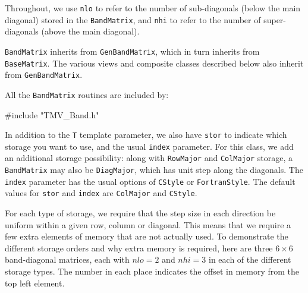 \documentclass[twoside,letterpaper,11pt]{article}
\renewcommand{\tt}[1]{{\lstinline {#1}}}
\begin{document}
Throughout, we use \tt{nlo} to refer to the number of sub-diagonals 
(below the main diagonal) stored
in the \tt{BandMatrix}, and \tt{nhi} to refer to the number of super-diagonals
(above the main diagonal).

\tt{BandMatrix} inherits from \tt{GenBandMatrix}, which in turn inherits from
\tt{BaseMatrix}.  
The various views and composite classes described below 
also inherit from \tt{GenBandMatrix}.

All the \tt{BandMatrix} routines are included by:
\begin{tmvcode}
#include "TMV_Band.h"
\end{tmvcode}

In addition to the \tt{T} template parameter, we also have \tt{stor} to indicate 
which storage you want to use, and the usual \tt{index} parameter.
For this class, we add an additional storage possibility:
along with \tt{RowMajor} and 
\tt{ColMajor} storage, a \tt{BandMatrix} may also be \tt{DiagMajor}, which 
has unit step along the diagonals.  The \tt{index} parameter has the usual
options of \tt{CStyle} or \tt{FortranStyle}.
The default values for \tt{stor} and \tt{index} are \tt{ColMajor} and \tt{CStyle}.

For each type of storage, we require that the step size in each direction
be uniform within a given row, column or diagonal. 
This means that we require a few extra elements
of memory that are not actually used.
To demonstrate the different storage orders and why extra memory is required, 
here are three $6 \times 6$ band-diagonal
matrices, each with $nlo = 2$ and $nhi = 3$ in each of the different storage
types.  The number in each place indicates the offset in memory from the 
top left element.
\end{document}
